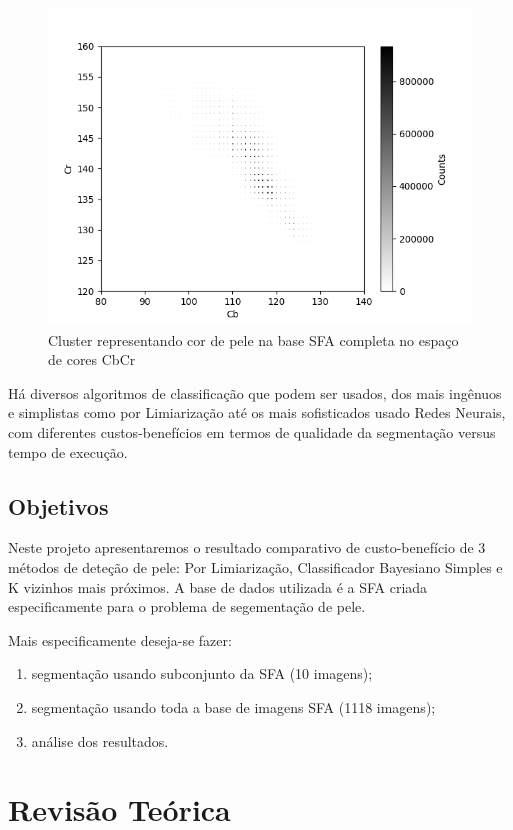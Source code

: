 \documentclass[conference]{IEEEtran}
\begin{document}
\begin{figure}[ht!]
\begin{center}
\includegraphics[width=.75\columnwidth]{histogram2d.png}
\caption{Cluster representando cor de pele na base SFA completa no espaço de cores CbCr}
\end{center}
\end{figure}

Há diversos algoritmos de classificação que podem ser usados, dos mais ingênuos e simplistas como por Limiarização até os mais sofisticados usado Redes Neurais, com diferentes custos-benefícios em termos de qualidade da segmentação versus tempo de execução.  

\subsection{Objetivos}
Neste projeto apresentaremos o resultado comparativo de custo-benefício de 3 métodos de deteção de pele: Por Limiarização, Classificador Bayesiano Simples e  K vizinhos mais próximos. A base de dados utilizada é a SFA\cite{sfa} criada especificamente para o problema de segementação de pele.

Mais especificamente deseja-se fazer:
\begin{enumerate}
\item  segmentação usando subconjunto da SFA (10 imagens);
\item  segmentação usando toda a base de imagens SFA (1118 imagens);
\item  análise dos resultados.
\end{enumerate}

\section{Revisão Teórica}
\end{document}
